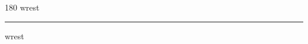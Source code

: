 
\begin{frame}
\begin{center}
\begin{turn}{180}
{\fontsize{2.5cm}{1em}\selectfont wrest}
\end{turn}
\vspace{1em}\par  
\hrule
\vspace{1em}\par  
{\fontsize{2.5cm}{1em}\selectfont wrest}
\end{center}
\end{frame}
